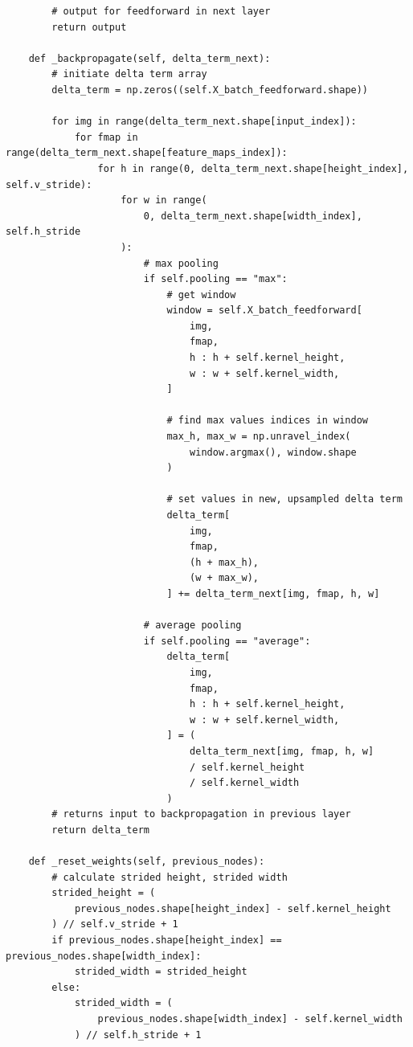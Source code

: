 \documentclass[%
oneside,                 %
final,                   %
10pt]{article}
\begin{document}
\begin{verbatim}
        # output for feedforward in next layer
        return output

    def _backpropagate(self, delta_term_next):
        # initiate delta term array
        delta_term = np.zeros((self.X_batch_feedforward.shape))

        for img in range(delta_term_next.shape[input_index]):
            for fmap in range(delta_term_next.shape[feature_maps_index]):
                for h in range(0, delta_term_next.shape[height_index], self.v_stride):
                    for w in range(
                        0, delta_term_next.shape[width_index], self.h_stride
                    ):
                        # max pooling
                        if self.pooling == "max":
                            # get window
                            window = self.X_batch_feedforward[
                                img,
                                fmap,
                                h : h + self.kernel_height,
                                w : w + self.kernel_width,
                            ]

                            # find max values indices in window
                            max_h, max_w = np.unravel_index(
                                window.argmax(), window.shape
                            )

                            # set values in new, upsampled delta term
                            delta_term[
                                img,
                                fmap,
                                (h + max_h),
                                (w + max_w),
                            ] += delta_term_next[img, fmap, h, w]

                        # average pooling
                        if self.pooling == "average":
                            delta_term[
                                img,
                                fmap,
                                h : h + self.kernel_height,
                                w : w + self.kernel_width,
                            ] = (
                                delta_term_next[img, fmap, h, w]
                                / self.kernel_height
                                / self.kernel_width
                            )
        # returns input to backpropagation in previous layer
        return delta_term

    def _reset_weights(self, previous_nodes):
        # calculate strided height, strided width
        strided_height = (
            previous_nodes.shape[height_index] - self.kernel_height
        ) // self.v_stride + 1
        if previous_nodes.shape[height_index] == previous_nodes.shape[width_index]:
            strided_width = strided_height
        else:
            strided_width = (
                previous_nodes.shape[width_index] - self.kernel_width
            ) // self.h_stride + 1


\end{verbatim}
\end{document}
